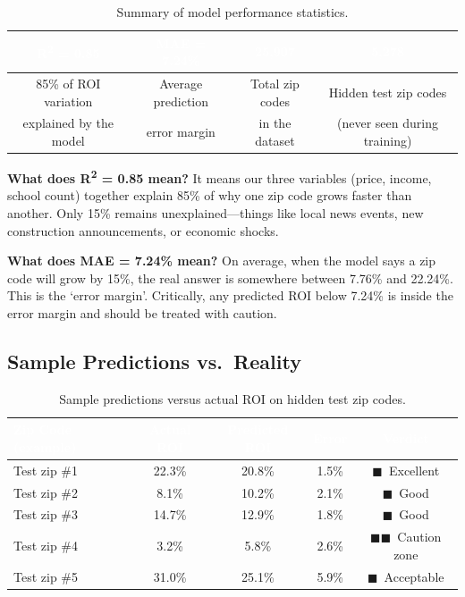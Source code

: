 \documentclass[12pt, a4paper]{article}
\newcommand{\good}{\textcolor{solidgreen}{$\blacksquare$}}
\newcommand{\caution}{\textcolor{cautionamber}{$\blacksquare\blacksquare$}}
\newcommand{\hrow}{\rowcolor{rowblue}}
\begin{document}
\begin{table}[H]
\centering
\renewcommand{\arraystretch}{1.4}
\begin{tabular}{cccc}
\toprule
\rowcolor{headerblue}
\textcolor{white}{\textbf{R\textsuperscript{2} = 0.85}} &
\textcolor{white}{\textbf{MAE = 7.24\%}} &
\textcolor{white}{\textbf{25,907}} &
\textcolor{white}{\textbf{5,278}} \\
\midrule
85\% of ROI variation & Average prediction & Total zip codes & Hidden test zip codes \\
explained by the model & error margin & in the dataset & (never seen during training) \\
\bottomrule
\end{tabular}
\caption{Summary of model performance statistics.}
\end{table}

\textbf{What does R\textsuperscript{2} = 0.85 mean?} It means our three variables (price, income, school count)
together explain 85\% of why one zip code grows faster than another. Only 15\% remains unexplained---things like
local news events, new construction announcements, or economic shocks.

\textbf{What does MAE = 7.24\% mean?} On average, when the model says a zip code will grow by 15\%, the real
answer is somewhere between 7.76\% and 22.24\%. This is the `error margin'. Critically, any predicted ROI below
7.24\% is inside the error margin and should be treated with caution.

\subsection*{Sample Predictions vs.\ Reality}

\begin{table}[H]
\centering
\renewcommand{\arraystretch}{1.4}
\begin{tabular}{lcccc}
\toprule
\rowcolor{headerblue}
\textcolor{white}{\textbf{Zip Code (example)}} &
\textcolor{white}{\textbf{Actual ROI}} &
\textcolor{white}{\textbf{Predicted ROI}} &
\textcolor{white}{\textbf{Error}} &
\textcolor{white}{\textbf{Verdict}} \\
\midrule
Test zip \#1 & 22.3\% & 20.8\% & 1.5\% & \good\ Excellent \\
\hrow Test zip \#2 & 8.1\%  & 10.2\% & 2.1\% & \good\ Good \\
Test zip \#3 & 14.7\% & 12.9\% & 1.8\% & \good\ Good \\
\hrow Test zip \#4 & 3.2\%  & 5.8\%  & 2.6\% & \caution\ Caution zone \\
Test zip \#5 & 31.0\% & 25.1\% & 5.9\% & \good\ Acceptable \\
\bottomrule
\end{tabular}
\caption{Sample predictions versus actual ROI on hidden test zip codes.}
\end{table}
\end{document}
